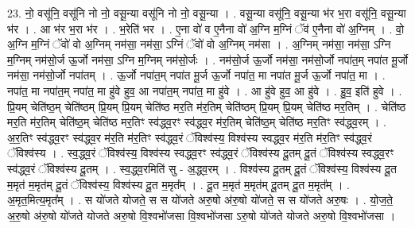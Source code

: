 \documentclass[17pt]{extarticle}
\begin{document}
23. नो॒ वसू॑नि॒ वसू॑नि नो नो॒ वसू॒न्या वसू॑नि नो नो॒ वसू॒न्या । . वसू॒न्या वसू॑नि॒ वसू॒न्या भ॑र भ॒रा वसू॑नि॒ वसू॒न्या भ॑र । . आ भ॑र भ॒रा भ॑र । . भ॒रेति॑ भर । . ए॒ना वो॑ व ए॒नैना वो॑ अ॒ग्नि म॒ग्निं ॅव॑ ए॒नैना वो॑ अ॒ग्निम् । . वो॒ अ॒ग्नि म॒ग्निं ॅवो॑ वो अ॒ग्निम् नम॑सा॒ नम॑सा॒ ऽग्निं ॅवो॑ वो अ॒ग्निम् नम॑सा । . अ॒ग्निम् नम॑सा॒ नम॑सा॒ ऽग्नि म॒ग्निम् नम॑सो॒र्ज ऊ॒र्जो नम॑सा॒ ऽग्नि म॒ग्निम् नम॑सो॒र्जः । . नम॑सो॒र्ज ऊ॒र्जो नम॑सा॒ नम॑सो॒र्जो नपा॑त॒म् नपा॑त मू॒र्जो नम॑सा॒ नम॑सो॒र्जो नपा॑तम् । . ऊ॒र्जो नपा॑त॒म् नपा॑त मू॒र्ज ऊ॒र्जो नपा॑त॒ मा नपा॑त मू॒र्ज ऊ॒र्जो नपा॑त॒ मा । . नपा॑त॒ मा नपा॑त॒म् नपा॑त॒ मा हु॑वे हुव॒ आ नपा॑त॒म् नपा॑त॒ मा हु॑वे । . आ हु॑वे हुव॒ आ हु॑वे । . हु॒व॒ इति॑ हुवे । . प्रि॒यम् चेति॑ष्ठ॒म् चेति॑ष्ठम् प्रि॒यम् प्रि॒यम् चेति॑ष्ठ मर॒ति म॑र॒तिम् चेति॑ष्ठम् प्रि॒यम् प्रि॒यम् चेति॑ष्ठ मर॒तिम् । . चेति॑ष्ठ मर॒ति म॑र॒तिम् चेति॑ष्ठ॒म् चेति॑ष्ठ मर॒तिꣳ स्व॑द्ध्व॒रꣳ स्व॑द्ध्व॒र म॑र॒तिम् चेति॑ष्ठ॒म् चेति॑ष्ठ मर॒तिꣳ स्व॑द्ध्व॒रम् । . अ॒र॒तिꣳ स्व॑द्ध्व॒रꣳ स्व॑द्ध्व॒र म॑र॒ति म॑र॒तिꣳ स्व॑द्ध्व॒रं ॅविश्व॑स्य॒ विश्व॑स्य स्वद्ध्व॒र म॑र॒ति म॑र॒तिꣳ स्व॑द्ध्व॒रं ॅविश्व॑स्य । . स्व॒द्ध्व॒रं ॅविश्व॑स्य॒ विश्व॑स्य स्वद्ध्व॒रꣳ स्व॑द्ध्व॒रं ॅविश्व॑स्य दू॒तम् दू॒तं ॅविश्व॑स्य स्वद्ध्व॒रꣳ स्व॑द्ध्व॒रं ॅविश्व॑स्य दू॒तम् । . स्व॒द्ध्व॒रमिति॑ सु - अ॒द्ध्व॒रम् । . विश्व॑स्य दू॒तम् दू॒तं ॅविश्व॑स्य॒ विश्व॑स्य दू॒त म॒मृत॑ म॒मृत॑म् दू॒तं ॅविश्व॑स्य॒ विश्व॑स्य दू॒त म॒मृत᳚म् । . दू॒त म॒मृत॑ म॒मृत॑म् दू॒तम् दू॒त म॒मृत᳚म् । . अ॒मृत॒मित्य॒मृत᳚म् । . स यो॑जते योजते॒ स स यो॑जते अरु॒षो अ॑रु॒षो यो॑जते॒ स स यो॑जते अरु॒षः । . यो॒ज॒ते॒ अ॒रु॒षो अ॑रु॒षो यो॑जते योजते अरु॒षो वि॒श्वभो॑जसा वि॒श्वभो॑जसा ऽरु॒षो यो॑जते योजते अरु॒षो वि॒श्वभो॑जसा । \newline
\end{document}
